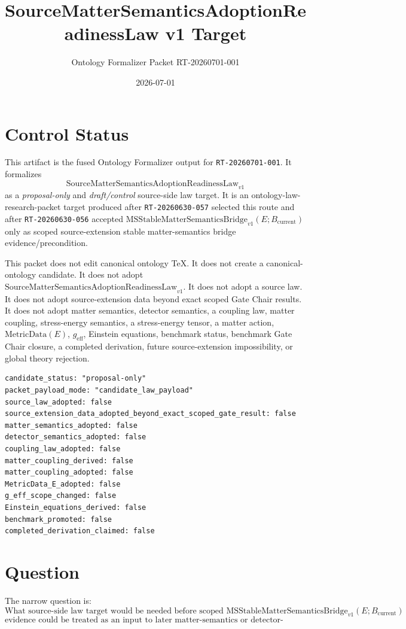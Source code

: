 \documentclass[11pt]{article}
\title{SourceMatterSemanticsAdoptionReadinessLaw v1 Target}
\author{Ontology Formalizer Packet RT-20260701-001}
\date{2026-07-01}
\newcommand{\Bcur}{B_{\mathrm{current}}}
\newcommand{\MSBridge}{\mathrm{MSStableMatterSemanticsBridge}_{v1}}
\newcommand{\SMSAR}{\mathrm{SourceMatterSemanticsAdoptionReadinessLaw}_{v1}}
\newcommand{\MetricData}{\mathrm{MetricData}}
\newcommand{\geff}{g_{\mathrm{eff}}}
\begin{document}
\maketitle

\section{Control Status}

This artifact is the fused Ontology Formalizer output for
\texttt{RT-20260701-001}. It formalizes
\[
  \SMSAR
\]
as a \emph{proposal-only} and \emph{draft/control} source-side law target.
It is an ontology-law-research-packet target produced after
\texttt{RT-20260630-057} selected this route and after
\texttt{RT-20260630-056} accepted
\(\MSBridge(E;\Bcur)\) only as scoped source-extension stable
matter-semantics bridge evidence/precondition.

This packet does not edit canonical ontology TeX. It does not create a
canonical-ontology candidate. It does not adopt \(\SMSAR\). It does not adopt
a source law. It does not adopt source-extension data beyond exact scoped
Gate Chair results. It does not adopt matter semantics, detector semantics, a
coupling law, matter coupling, stress-energy semantics, a stress-energy
tensor, a matter action, \(\MetricData(E)\), \(\geff\), Einstein equations,
benchmark status, benchmark Gate Chair closure, a completed derivation,
future source-extension impossibility, or global theory rejection.

\begin{verbatim}
candidate_status: "proposal-only"
packet_payload_mode: "candidate_law_payload"
source_law_adopted: false
source_extension_data_adopted_beyond_exact_scoped_gate_result: false
matter_semantics_adopted: false
detector_semantics_adopted: false
coupling_law_adopted: false
matter_coupling_derived: false
matter_coupling_adopted: false
MetricData_E_adopted: false
g_eff_scope_changed: false
Einstein_equations_derived: false
benchmark_promoted: false
completed_derivation_claimed: false
\end{verbatim}

\section{Question}

The narrow question is:
\[
\text{What source-side law target would be needed before scoped }
\MSBridge(E;\Bcur)
\]
\[
\text{evidence could be treated as an input to later matter-semantics or
detector-semantics adoption-readiness work?}
\]
\end{document}

